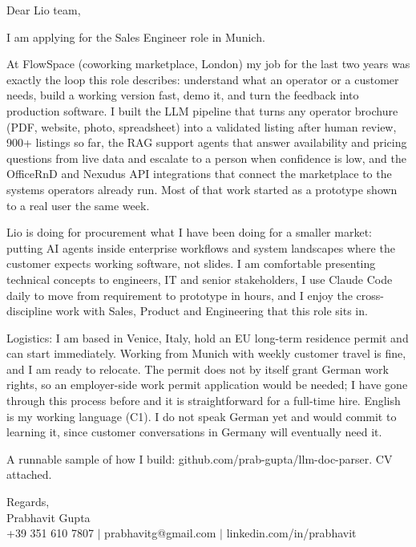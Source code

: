 \documentclass[a4paper,11pt]{article}
\begin{document}
Dear Lio team,

I am applying for the Sales Engineer role in Munich.

At FlowSpace (coworking marketplace, London) my job for the last two years was exactly the loop this role describes: understand what an operator or a customer needs, build a working version fast, demo it, and turn the feedback into production software. I built the LLM pipeline that turns any operator brochure (PDF, website, photo, spreadsheet) into a validated listing after human review, 900+ listings so far, the RAG support agents that answer availability and pricing questions from live data and escalate to a person when confidence is low, and the OfficeRnD and Nexudus API integrations that connect the marketplace to the systems operators already run. Most of that work started as a prototype shown to a real user the same week.

Lio is doing for procurement what I have been doing for a smaller market: putting AI agents inside enterprise workflows and system landscapes where the customer expects working software, not slides. I am comfortable presenting technical concepts to engineers, IT and senior stakeholders, I use Claude Code daily to move from requirement to prototype in hours, and I enjoy the cross-discipline work with Sales, Product and Engineering that this role sits in.

Logistics: I am based in Venice, Italy, hold an EU long-term residence permit and can start immediately. Working from Munich with weekly customer travel is fine, and I am ready to relocate. The permit does not by itself grant German work rights, so an employer-side work permit application would be needed; I have gone through this process before and it is straightforward for a full-time hire. English is my working language (C1). I do not speak German yet and would commit to learning it, since customer conversations in Germany will eventually need it.

A runnable sample of how I build: github.com/prab-gupta/llm-doc-parser. CV attached.

Regards,\\
Prabhavit Gupta\\
+39 351 610 7807 $\vert$ prabhavitg@gmail.com $\vert$ linkedin.com/in/prabhavit
\end{document}
